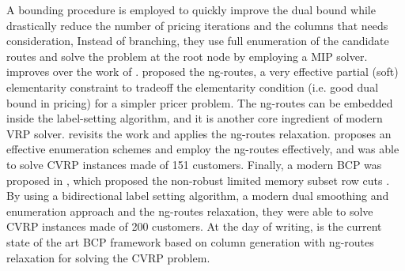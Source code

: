 A bounding procedure is employed to quickly
improve the dual bound while drastically reduce the number
of pricing iterations and the columns that needs consideration,
Instead of branching, they use full enumeration of the candidate
routes and solve the problem at the root node by employing a MIP solver.
\textcite{pessoa2008a} improves over the work of \citeauthor{fukasawa2006}.
\textcite{baldacci2011} proposed the ng-routes, a very effective
partial (soft) elementarity constraint
to tradeoff the elementarity condition (i.e. good dual bound in pricing)
for a simpler pricer problem.
The ng-routes can be embedded inside the label-setting algorithm, and
it is another core ingredient of modern VRP solver.
\textcite{ropke2012} revisits the work \citeauthor{fukasawa2006} and applies
the ng-routes relaxation.
\textcite{contardo2014} proposes an effective enumeration schemes and employ the ng-routes effectively,
and was able to solve CVRP instances made of 151 customers.
Finally, a modern BCP was proposed in \textcite{pecin2017}, which
proposed the non-robust limited memory subset row cuts \parencite{pecin2017a}.
By using a bidirectional label setting algorithm, a modern dual smoothing and enumeration
approach and the ng-routes relaxation, they were able to solve CVRP
instances made of 200 customers.
At the day of writing, \textcite{pessoa2020a} is the current state of the
art BCP framework based on column generation with ng-routes relaxation
for solving the CVRP problem.






\begin{comment}
\cite{jepsen_branch-and-cut_2011}

Before 1980 very few exact algorithms for cvrp and vrptw had been
proposed, but in the early 1980s two new exact methods where proposed.
From this point the history of exact methods for cvrp and vrptw can
be divided into three phases. The first phase was the introduction of the
Set Partition and the development of Branch-and-Cut-and-Price (bp) algo-
rithms using a relaxed pricing problem. The second was the development of
Branch-and-Cut (bac) algorithms. In the current phase the pricing problem
is no longer relaxed and cuts in the master problem of the Branch-and-Cut-
and-Price algorithms is used. The first two phases where started at the same
point in time and there is still development on the algorithms in the context
of cvrp and vrptw. The algorithms from these two phases are also used
on several other variants of the Vehicle Routing Problem. The third phase
was started in the middle of the 2000s and the algorithms from this phase
are currently the best overall performing algorithms.
\end{comment}

